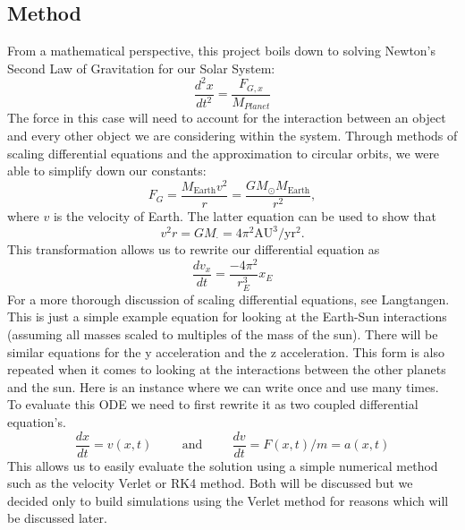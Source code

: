 \documentclass{article}
\begin{document}
\subsection{Method}
From a mathematical perspective, this project boils down to solving Newton's Second Law of Gravitation for our Solar System:
\begin{equation}
\frac{d^2x}{dt^2}=\frac{F_{G,x}}{M_{Planet}}
\end{equation}
The force in this case will need to account for the interaction between an object and every other object we are considering within the system. Through methods of scaling differential equations and the approximation to circular orbits, we were able to simplify down our constants:
\[
F_G= \frac{M_{\mathrm{Earth}}v^2}{r}=\frac{GM_{\odot}M_{\mathrm{Earth}}}{r^2},
\]
where $v$ is the velocity of Earth. The latter equation can be used to show that
\[
v^2r=GM_{\cdot}=4\pi^2\mathrm{AU}^3/\mathrm{yr}^2.
\]
This transformation allows us to rewrite our differential equation as 
\begin{equation}
\frac{dv_x}{dt} = \frac{-4 \pi^2}{r_E^3} x_E
\end{equation}
For a more thorough discussion of scaling differential equations, see Langtangen\cite{hpl text}. This is just a simple example equation for looking at the Earth-Sun interactions (assuming all masses scaled to multiples of the mass of the sun). There will be similar equations for the y acceleration and the z acceleration. This form is also repeated when it comes to looking at the interactions between the other planets and the sun. Here is an instance where we can write once and use many times.\\

To evaluate this ODE we need to first rewrite it as two coupled differential equation's. 
\begin{equation}
 \frac{dx}{dt}=v(x,t) \hspace{1cm}\mathrm{and}\hspace{1cm} \frac{dv}{dt}=F(x,t)/m=a(x,t)
\end{equation}
This allows us to easily evaluate the solution using a simple numerical method such as the velocity Verlet or RK4 method. Both will be discussed but we decided only to build simulations using the Verlet method for reasons which will be discussed later. 
\end{document}
